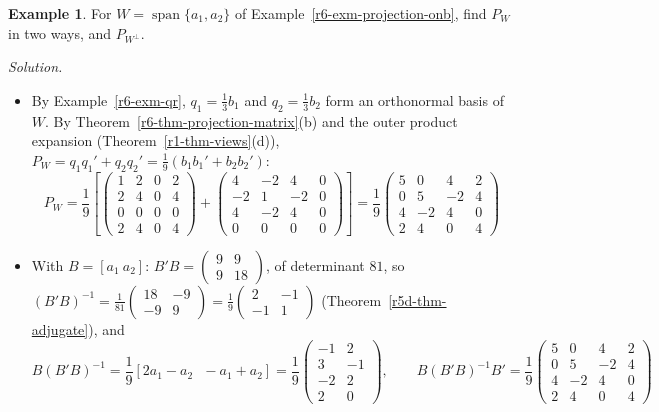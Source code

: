 \documentclass[12pt]{article}
\DeclareMathOperator{\Span}{span}
\theoremstyle{definition}
\newtheorem{example}[theorem]{Example}
\begin{document}
\begin{example}\label{r6-exm-projection-matrix}
For \(W=\Span\{a_1,a_2\}\) of Example~\ref{r6-exm-projection-onb}, find \(P_W\) in two ways, and \(P_{W^\perp}\).

\textit{Solution.}
\begin{itemize}
\item By Example~\ref{r6-exm-qr}, \(q_1=\frac13b_1\) and \(q_2=\frac13b_2\) form an orthonormal basis of \(W\).
By Theorem~\ref{r6-thm-projection-matrix}(b) and the outer product expansion (Theorem~\ref{r1-thm-views}(d)),
\(P_W=q_1q_1'+q_2q_2'=\frac19(b_1b_1'+b_2b_2')\):
\[
P_W=\frac19\left[\begin{pmatrix}1&2&0&2\\2&4&0&4\\0&0&0&0\\2&4&0&4\end{pmatrix}
+\begin{pmatrix}4&-2&4&0\\-2&1&-2&0\\4&-2&4&0\\0&0&0&0\end{pmatrix}\right]
=\frac19\begin{pmatrix}5&0&4&2\\0&5&-2&4\\4&-2&4&0\\2&4&0&4\end{pmatrix}
\]
\item With \(B=[a_1\ a_2]\): \(B'B=\left(\begin{smallmatrix}9&9\\9&18\end{smallmatrix}\right)\), of determinant
\(81\), so \((B'B)^{-1}=\frac1{81}\left(\begin{smallmatrix}18&-9\\-9&9\end{smallmatrix}\right)
=\frac19\left(\begin{smallmatrix}2&-1\\-1&1\end{smallmatrix}\right)\) (Theorem~\ref{r5d-thm-adjugate}), and
\[
B(B'B)^{-1}=\frac19[2a_1-a_2\ \ \ -a_1+a_2]=\frac19\begin{pmatrix}-1&2\\3&-1\\-2&2\\2&0\end{pmatrix},\qquad
B(B'B)^{-1}B'=\frac19\begin{pmatrix}5&0&4&2\\0&5&-2&4\\4&-2&4&0\\2&4&0&4\end{pmatrix}
\]
\end{itemize}
\end{example}
\end{document}
